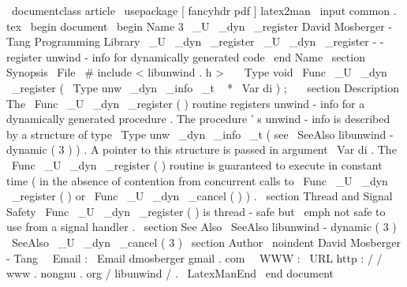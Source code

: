 \
documentclass
{
article
}
\
usepackage
[
fancyhdr
pdf
]
{
latex2man
}
\
input
{
common
.
tex
}
\
begin
{
document
}
\
begin
{
Name
}
{
3
}
{
\
_U
\
_dyn
\
_register
}
{
David
Mosberger
-
Tang
}
{
Programming
Library
}
{
\
_U
\
_dyn
\
_register
}
\
_U
\
_dyn
\
_register
-
-
register
unwind
-
info
for
dynamically
generated
code
\
end
{
Name
}
\
section
{
Synopsis
}
\
File
{
\
#
include
<
libunwind
.
h
>
}
\
\
\
Type
{
void
}
\
Func
{
\
_U
\
_dyn
\
_register
}
(
\
Type
{
unw
\
_dyn
\
_info
\
_t
~
*
}
\
Var
{
di
}
)
;
\
\
\
section
{
Description
}
The
\
Func
{
\
_U
\
_dyn
\
_register
}
(
)
routine
registers
unwind
-
info
for
a
dynamically
generated
procedure
.
The
procedure
'
s
unwind
-
info
is
described
by
a
structure
of
type
\
Type
{
unw
\
_dyn
\
_info
\
_t
}
(
see
\
SeeAlso
{
libunwind
-
dynamic
(
3
)
}
)
.
A
pointer
to
this
structure
is
passed
in
argument
\
Var
{
di
}
.
The
\
Func
{
\
_U
\
_dyn
\
_register
}
(
)
routine
is
guaranteed
to
execute
in
constant
time
(
in
the
absence
of
contention
from
concurrent
calls
to
\
Func
{
\
_U
\
_dyn
\
_register
}
(
)
or
\
Func
{
\
_U
\
_dyn
\
_cancel
}
(
)
)
.
\
section
{
Thread
and
Signal
Safety
}
\
Func
{
\
_U
\
_dyn
\
_register
}
(
)
is
thread
-
safe
but
\
emph
{
not
}
safe
to
use
from
a
signal
handler
.
\
section
{
See
Also
}
\
SeeAlso
{
libunwind
-
dynamic
(
3
)
}
\
SeeAlso
{
\
_U
\
_dyn
\
_cancel
(
3
)
}
\
section
{
Author
}
\
noindent
David
Mosberger
-
Tang
\
\
Email
:
\
Email
{
dmosberger
gmail
.
com
}
\
\
WWW
:
\
URL
{
http
:
/
/
www
.
nongnu
.
org
/
libunwind
/
}
.
\
LatexManEnd
\
end
{
document
}
